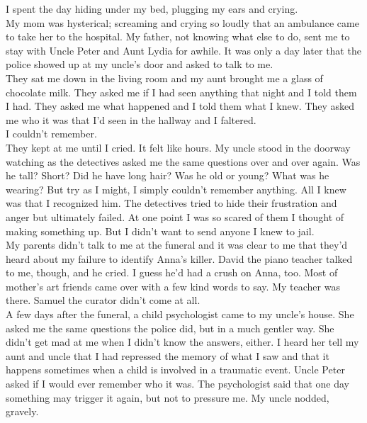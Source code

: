 \documentclass[a5paper]{scrartcl}
\begin{document}
I spent the day hiding under my bed, plugging my ears and crying.\\


My mom was hysterical; screaming and crying so loudly that an ambulance came to take her to the hospital. My father, not knowing what else to do, sent me to stay with Uncle Peter and Aunt Lydia for awhile. It was only a day later that the police showed up at my uncle's door and asked to talk to me.\\


They sat me down in the living room and my aunt brought me a glass of chocolate milk. They asked me if I had seen anything that night and I told them I had. They asked me what happened and I told them what I knew. They asked me who it was that I'd seen in the hallway and I faltered. \\


I couldn't remember.\\


They kept at me until I cried. It felt like hours. My uncle stood in the doorway watching as the detectives asked me the same questions over and over again. Was he tall? Short? Did he have long hair? Was he old or young? What was he wearing? But try as I might, I simply couldn't remember anything. All I knew was that I recognized him. The detectives tried to hide their frustration and anger but ultimately failed. At one point I was so scared of them I thought of making something up. But I didn't want to send anyone I knew to jail.\\


My parents didn't talk to me at the funeral and it was clear to me that they'd heard about my failure to identify Anna's killer. David the piano teacher talked to me, though, and he cried. I guess he'd had a crush on Anna, too. Most of mother's art friends came over with a few kind words to say. My teacher was there. Samuel the curator didn't come at all.\\


A few days after the funeral, a child psychologist came to my uncle's house. She asked me the same questions the police did, but in a much gentler way. She didn't get mad at me when I didn't know the answers, either. I heard her tell my aunt and uncle that I had repressed the memory of what I saw and that it happens sometimes when a child is involved in a traumatic event. Uncle Peter asked if I would ever remember who it was. The psychologist said that one day something may trigger it again, but not to pressure me. My uncle nodded, gravely.\\
\end{document}
